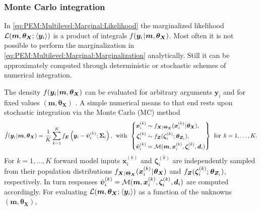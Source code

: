 \subsubsection{Monte Carlo integration} \label{sec:PEM:Multilevel:MonteCarloIntegration}
In \cref{eq:PEM:Multilevel:Marginal:Likelihood} the marginalized likelihood \(\mathcal{L} (\bm{m},\bm{\theta}_{\bm{X}} ;{\:\!} \langle{\bm{y}_i}\rangle)\) is a product of integrals \(f(\bm{y}_i {\:\!}|{\:\!} \bm{m},\bm{\theta}_{\bm{X}})\).
Most often it is not possible to perform the marginalization in \cref{eq:PEM:Multilevel:Marginal:Marginalization} analytically.
Still it can be approximately computed through deterministic or stochastic schemes of numerical integration.
\par %
The density \(f(\bm{y}_i {\:\!}|{\:\!} \bm{m},\bm{\theta}_{\bm{X}})\) can be evaluated for arbitrary arguments \(\bm{y}_i\) and for fixed values \((\bm{m},\bm{\theta}_{\bm{X}})\) .
A simple numerical means to that end rests upon stochastic integration via the Monte Carlo (MC) method
\begin{equation} \label{eq:PEM:Multilevel:Marginal:DensityEstimator}
  \hat{f} (\bm{y}_i \cond \bm{m},\bm{\theta}_{\bm{X}})
  = \frac{1}{K} \sum\limits_{k=1}^{K} f_{\bm{E}} \left( \bm{y}_i-\perfect{\bm{\upsilon}}_i^{(k)} \distparam \bm{\Sigma}_i \right),
  \;\, \text{with} \;\, \left\{
  \begin{aligned}
    \bm{x}_i^{(k)}     &\sim f_{\bm{X} \cond \bm{\Theta}_{\bm{X}}}(\bm{x}_i^{(k)} \cond \bm{\theta}_{\bm{X}}),\\
    \bm{\zeta}_i^{(k)} &\sim f_{\bm{Z}}(\bm{\zeta}_i^{(k)} \distparam \bm{\theta}_{\bm{Z}_i}),\\
    \perfect{\bm{\upsilon}}_i^{(k)} &= \mathcal{M}(\bm{m},\bm{x}_i^{(k)},\bm{\zeta}_i^{(k)},\bm{d}_i)
  \end{aligned}
  \right\} \;\, \text{for} \;\, k=1,\ldots,K.
\end{equation}
For \(k=1,\ldots,K\) forward model inputs \(\bm{x}_i^{(k)}\) and \(\bm{\zeta}_i^{(k)}\) are independently sampled from their population distributions
\(f_{\bm{X} {\:\!}|{\:\!} \bm{\Theta}_{\bm{X}}}(\bm{x}_i^{(k)} {\:\!}|{\:\!} \bm{\theta}_{\bm{X}})\) and \(f_{\bm{Z}}(\bm{\zeta}_i^{(k)} ;{\:\!} \bm{\theta}_{\bm{Z}_i})\), respectively.
In turn responses \(\tilde{\bm{\upsilon}}_i^{(k)} = \mathcal{M}(\bm{m},\bm{x}_i^{(k)},\bm{\zeta}_i^{(k)},\bm{d}_i)\) are computed accordingly.
For evaluating \(\mathcal{L} (\bm{m},\bm{\theta}_{\bm{X}} ;{\:\!} \langle{\bm{y}_i}\rangle)\) as a function of the unknowns \((\bm{m},\bm{\theta}_{\bm{X}})\),
